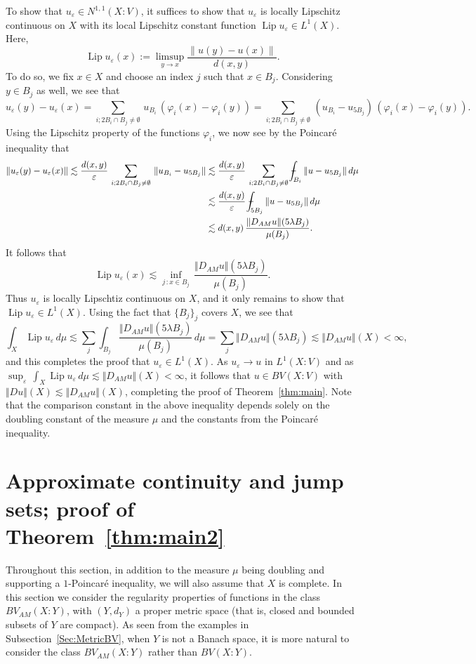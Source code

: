 \documentclass[11pt, letterpaper]{amsart} %
\newcommand*{\eps}{\varepsilon}
\newcommand*{\pip}{\varphi}
\providecommand*{\vint}[1]{\mathchoice
          {\mathop{\vrule width 5pt height 3 pt depth -2.5pt
                  \kern -9pt \kern 1pt\intop}\nolimits_{\kern -5pt{#1}}}
          {\mathop{\vrule width 5pt height 3 pt depth -2.6pt
                  \kern -6pt \intop}\nolimits_{\kern -3pt{#1}}}
          {\mathop{\vrule width 5pt height 3 pt depth -2.6pt
                  \kern -6pt \intop}\nolimits_{\kern -3pt{#1}}}
          {\mathop{\vrule width 5pt height 3 pt depth -2.6pt
                  \kern -6pt \intop}\nolimits_{\kern -3pt{#1}}}}
\DeclareMathOperator{\Lip}{Lip}
\numberwithin{equation}{section}
\theoremstyle{plain}
\theoremstyle{definition}
\begin{document}
{To show that $u_\eps\in N^{1,1}(X:V)$, it suffices to show that $u_\eps$ is locally Lipschitz continuous on $X$ with its
local Lipschitz constant function $\Lip u_\eps\in L^1(X)$. Here,
\[
\Lip u_\eps(x):=\limsup_{y\to x}\frac{\|u(y)-u(x)\|}{d(x,y)}.
\]
To do so, we fix $x\in X$ and choose an index $j$ such that $x\in B_j$. Considering $y\in B_j$ as well, we see that
\[
u_\eps(y)-u_\eps(x)=\sum_{i; 2B_i\cap B_j\ne\emptyset}\, u_{B_i}\, \left(\pip_i(x)-\pip_i(y)\right)
=\sum_{i; 2B_i\cap B_j\ne\emptyset}\, \left(u_{B_i}-u_{5B_j}\right)\, \left(\pip_i(x)-\pip_i(y)\right).
\]
Using the Lipschitz property of the functions $\pip_i$, we now see by the Poincar\'e inequality that
\begin{align*}
\|u_\eps(y)-u_\eps(x)\|\lesssim\frac{d(x,y)}{\eps}\, \sum_{i; 2B_i\cap B_j\ne\emptyset}\, \|u_{B_i}-u_{5B_j}\|
&\lesssim\frac{d(x,y)}{\eps}\, \sum_{i; 2B_i\cap B_j\ne\emptyset}\, \vint{B_i}\|u-u_{5B_j}\|\, d\mu\\
&\lesssim\frac{d(x,y)}{\eps}\, \vint{5B_j}\|u-u_{5B_j}\|\, d\mu\\
&\lesssim d(x,y)\, \frac{\Vert D_{AM}u\Vert(5\lambda B_j)}{\mu(B_j)}.
\end{align*}
It follows that
\[
\Lip u_\eps(x)\lesssim \inf_{j\, :x\in B_j}\, \frac{\Vert D_{AM}u\Vert(5\lambda B_j)}{\mu(B_j)}.
\]
Thus $u_\eps$ is locally Lipschtiz continuous on $X$, and it only remains to show that $\Lip u_\eps\in L^1(X)$. 
Using the fact that $\{B_j\}_j$ covers $X$, we see that
\[
\int_X\Lip u_\eps\, d\mu\lesssim\sum_j\int_{B_j} \frac{\Vert D_{AM}u\Vert(5\lambda B_j)}{\mu(B_j)}\, d\mu
 =\sum_j \Vert D_{AM}u\Vert(5\lambda B_j)\lesssim\Vert D_{AM}u\Vert(X)<\infty,
\]
and this completes the proof that $u_\eps\in L^1(X)$. As $u_\eps\to u$ in $L^1(X:V)$ and as
$\sup_\eps\, \int_X\Lip u_\eps\, d\mu\lesssim \Vert D_{AM}u\Vert(X)<\infty$, it follows that 
$u\in BV(X:V)$ with $\Vert Du\Vert(X)\lesssim \Vert D_{AM}u\Vert(X)$, completing the proof of 
Theorem~\ref{thm:main}. Note that the comparison constant in the above inequality depends solely on
the doubling constant of the measure $\mu$ and the constants from the Poincar\'e inequality.



\section{Approximate continuity and jump sets; proof of Theorem~\ref{thm:main2}}\label{sec:JumpSets}

Throughout this section, in addition to the measure $\mu$ being doubling and supporting a
$1$-Poincar\'e inequality, we will also assume that $X$ is complete.
In this section we consider the regularity properties of functions in the class $BV_{AM}(X:Y)$, 
with $(Y,d_Y)$ a proper metric space (that is,
closed and bounded subsets of $Y$ are compact). As seen from the examples in Subsection~\ref{Sec:MetricBV}, 
when $Y$ is not a Banach space, it is more natural to consider the class $BV_{AM}(X:Y)$ rather than $BV(X:Y)$.

}
\end{document}
